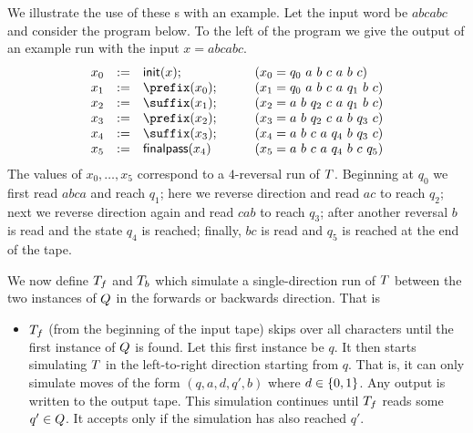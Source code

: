 {We illustrate the use of these \FT{}s with an example.  Let the input word be
$a b c a b c$
and consider the program below.
%
To the left of the program we give the output of an example run with the input
$x = a b c a b c$.
%
\[
    \begin{array}{rcll}
        x_0 &:=& \init(x);
            & \qquad (x_0 = q_0\ a\ b\ c\ a\ b\ c) \\
        x_1 &:=& \prefix(x_0);
            & \qquad (x_1 = q_0\ a\ b\ c\ a\ q_1\ b\ c) \\
        x_2 &:=& \suffix(x_1);
            & \qquad (x_2 = a\ b\ q_2\ c\ a\ q_1\ b\ c) \\
        x_3 &:=& \prefix(x_2);
            & \qquad (x_3 = a\ b\ q_2\ c\ a\ b\ q_3\ c) \\
        x_4 &:=& \suffix(x_3);
            & \qquad (x_4 = a\ b\ c\ a\ q_4\ b\ q_3\ c) \\
        x_5 &:=& \finalpass(x_4)
            & \qquad (x_5 = a\ b\ c\ a\ q_4\ b\ c\ q_5) \\
    \end{array}
\]
%
The values of
$x_0, \ldots, x_5$
correspond to a $4$-reversal run of $T$.
%
Beginning at $q_0$ we first read $abca$ and reach $q_1$; here we reverse
direction and read $ac$ to reach $q_2$; next we reverse direction again and
read $c a b$ to reach $q_3$; after another reversal $b$ is read and the state
$q_4$ is reached; finally, $bc$ is read and $q_5$ is reached at the end of the
tape.

We now define $T_f$ and $T_b$ which simulate a
single-direction run of $T$ between the two instances of $Q$
in the forwards or backwards direction.
%
That is
\begin{itemize}
\item
    $T_f$ (from the beginning of the input tape) skips over all
    characters until the first instance of $Q$ is found.
    Let this first instance be $q$.
    It then starts simulating $T$ in the left-to-right direction
    starting from $q$.
    That is, it can only simulate moves of the form
    $(q, a, d, q', b)$
    where
    $d \in \{0, 1\}$.
    Any output is written to the output tape.
    This simulation continues until $T_f$ reads some
    $q' \in Q$.
    It accepts only if the simulation has also reached $q'$.


\end{itemize}}
